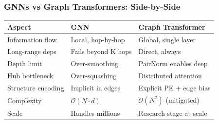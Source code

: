 \begin{frame}[fragile]\frametitle{GNNs vs Graph Transformers: Side-by-Side}

\begin{center}
\begin{tabular}{|l|l|l|}
\hline
\textbf{Aspect} & \textbf{GNN} & \textbf{Graph Transformer} \\
\hline
Information flow & Local, hop-by-hop & Global, single layer \\
Long-range deps & Fails beyond K hops & Direct, always \\
Depth limit & Over-smoothing & PairNorm enables deep \\
Hub bottleneck & Over-squashing & Distributed attention \\
Structure encoding & Implicit in edges & Explicit PE + edge bias \\
Complexity & $\mathcal{O}(N \cdot d)$ & $\mathcal{O}(N^2)$ (mitigated) \\
Scale & Handles millions & Research-stage at scale \\
\hline
\end{tabular}
\end{center}

\end{frame}

